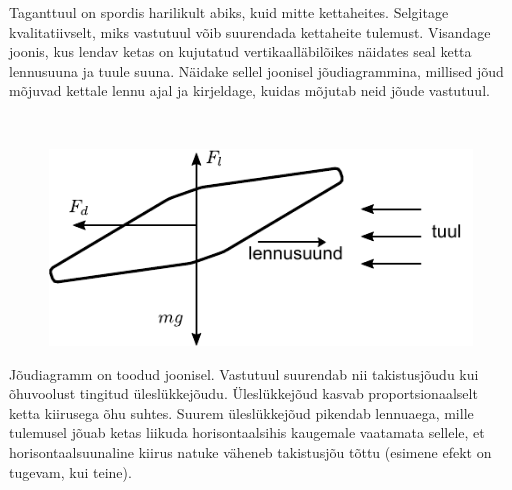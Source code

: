 
Taganttuul on spordis harilikult abiks, kuid mitte kettaheites. Selgitage kvalitatiivselt, miks vastutuul võib suurendada kettaheite tulemust. Visandage joonis, kus lendav ketas on kujutatud vertikaalläbilõikes näidates seal ketta lennusuuna ja tuule suuna. Näidake sellel joonisel jõudiagrammina, millised jõud mõjuvad kettale lennu ajal ja kirjeldage, kuidas mõjutab neid jõude vastutuul.


\hint

\solu
\

\begin{figure}[h]
    \centering
    \includegraphics[]{2022-v3g-01-yl.pdf}
\end{figure}

Jõudiagramm on toodud joonisel. Vastutuul suurendab nii takistusjõudu kui õhuvoolust tingitud üleslükkejõudu. Üleslükkejõud kasvab proportsionaalselt ketta kiirusega õhu suhtes. Suurem üleslükkejõud pikendab lennuaega, mille tulemusel jõuab ketas liikuda horisontaalsihis kaugemale vaatamata sellele, et horisontaalsuunaline kiirus natuke väheneb takistusjõu tõttu (esimene efekt on tugevam, kui teine).
\probend